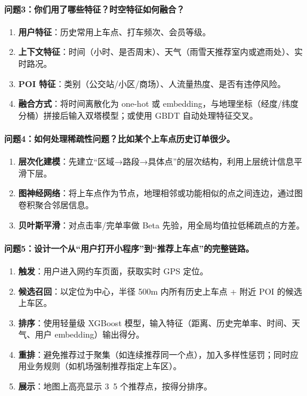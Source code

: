 \documentclass[12pt,a4paper]{article}
\begin{document}
\paragraph{问题3：你们用了哪些特征？时空特征如何融合？}
\begin{enumerate}[label=(\arabic*)]
\item \textbf{用户特征}：历史常用上车点、打车频次、会员等级。
\item \textbf{上下文特征}：时间（小时、是否周末）、天气（雨雪天推荐室内或遮雨处）、实时路况。
\item \textbf{POI 特征}：类别（公交站/小区/商场）、人流量热度、是否有违停风险。
\item \textbf{融合方式}：将时间离散化为 one-hot 或 embedding，与地理坐标（经度/纬度分桶）拼接后输入双塔模型；或使用 GBDT 自动处理特征交叉。
\end{enumerate}

\paragraph{问题4：如何处理稀疏性问题？比如某个上车点历史订单很少。}
\begin{enumerate}[label=(\arabic*)]
\item \textbf{层次化建模}：先建立“区域→路段→具体点”的层次结构，利用上层统计信息平滑下层。
\item \textbf{图神经网络}：将上车点作为节点，地理相邻或功能相似的点之间连边，通过图卷积聚合邻居信息。
\item \textbf{贝叶斯平滑}：对点击率/完单率做 Beta 先验，用全局均值拉低稀疏点的方差。
\end{enumerate}

\paragraph{问题5：设计一个从“用户打开小程序”到“推荐上车点”的完整链路。}
\begin{enumerate}[label=(\arabic*)]
\item \textbf{触发}：用户进入网约车页面，获取实时 GPS 定位。
\item \textbf{候选召回}：以定位为中心，半径 500m 内所有历史上车点 + 附近 POI 的候选上车区。
\item \textbf{排序}：使用轻量级 XGBoost 模型，输入特征（距离、历史完单率、时间、天气、用户 embedding）输出得分。
\item \textbf{重排}：避免推荐过于聚集（如连续推荐同一个点），加入多样性惩罚；同时应用业务规则（如机场强制推荐指定上车区）。
\item \textbf{展示}：地图上高亮显示 3~5 个推荐点，按得分排序。
\end{enumerate}
\end{document}
